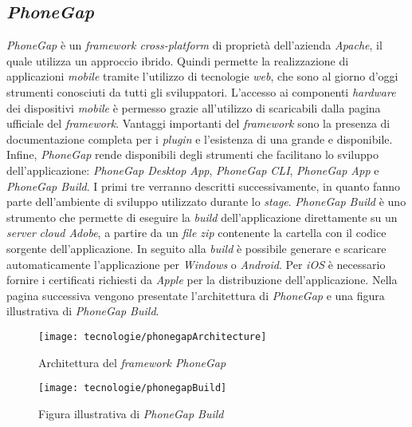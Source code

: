 \subsection{\textit{PhoneGap}}

\textit{PhoneGap} è un \textit{framework cross-platform} di proprietà dell'azienda \textit{Apache}, il quale utilizza un approccio ibrido. Quindi permette la realizzazione di applicazioni \textit{mobile} tramite l'utilizzo di tecnologie \textit{web}, che sono al giorno d'oggi strumenti conosciuti da tutti gli sviluppatori. L'accesso ai componenti \textit{hardware} dei dispositivi \textit{mobile} è permesso grazie all'utilizzo di  scaricabili dalla pagina ufficiale del \textit{framework}. Vantaggi importanti del \textit{framework} sono la presenza di documentazione completa per i \textit{plugin} e l'esistenza di una  grande e disponibile. Infine, \textit{PhoneGap} rende disponibili degli strumenti che facilitano lo sviluppo dell'applicazione: \textit{PhoneGap Desktop App}, \textit{PhoneGap CLI}, \textit{PhoneGap App} e \textit{PhoneGap Build}. I primi tre verranno descritti successivamente, in quanto fanno parte dell'ambiente di sviluppo utilizzato durante lo \textit{stage}. \textit{PhoneGap Build} è uno strumento che permette di eseguire la \textit{build} dell'applicazione direttamente su un \textit{server} \textit{cloud Adobe}, a partire da un \textit{file zip} contenente la cartella con il codice sorgente dell'applicazione. In seguito alla \textit{build} è possibile generare e scaricare automaticamente l'applicazione per \textit{Windows} o \textit{Android}. Per \textit{iOS} è necessario fornire i certificati richiesti da \textit{Apple} per la distribuzione dell'applicazione. Nella pagina successiva vengono presentate l'architettura di \textit{PhoneGap} e una figura illustrativa di \textit{PhoneGap Build}.

\begin{figure}[!h] 
    \centering 
    \texttt{[image: tecnologie/phonegapArchitecture]} 
    \caption{Architettura del \textit{framework PhoneGap}}
\end{figure}

\begin{figure}[!h] 
    \centering 
    \texttt{[image: tecnologie/phonegapBuild]} 
    \caption{Figura illustrativa di \textit{PhoneGap Build}}
\end{figure}

\newpage


